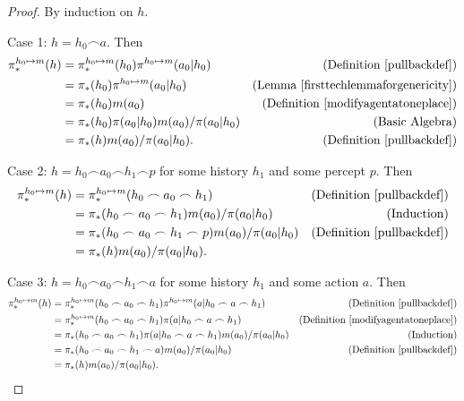 \documentclass[runningheads]{llncs}
\begin{document}
\begin{proof}
    By induction on $h$.

    Case 1: $h=h_0\frown a$. Then
    \begin{align*}
        \pi^{h_0\mapsto m}_*(h)
        &= \pi^{h_0\mapsto m}_*(h_0)\pi^{h_0\mapsto m}(a_0|h_0)
            &\mbox{(Definition \ref{pullbackdef})}\\
        &= \pi_*(h_0)\pi^{h_0\mapsto m}(a_0|h_0)
            &\mbox{(Lemma \ref{firsttechlemmaforgenericity})}\\
        &= \pi_*(h_0)m(a_0)
            &\mbox{(Definition \ref{modifyagentatoneplace})}\\
        &= \pi_*(h_0)\pi(a_0|h_0)m(a_0)/\pi(a_0|h_0)
            &\mbox{(Basic Algebra)}\\
        &= \pi_*(h)m(a_0)/\pi(a_0|h_0).
            &\mbox{(Definition \ref{pullbackdef})}
    \end{align*}

    Case 2: $h=h_0\frown a_0\frown h_1\frown p$ for some history $h_1$
        and some percept $p$. Then
    \begin{align*}
        \pi^{h_0\mapsto m}_*(h)
        &= \pi^{h_0\mapsto m}_*(h_0\frown a_0\frown h_1)
            &\mbox{(Definition \ref{pullbackdef})}\\
        &= \pi_*(h_0\frown a_0\frown h_1)m(a_0)/\pi(a_0|h_0)
            &\mbox{(Induction)}\\
        &= \pi_*(h_0\frown a_0\frown h_1\frown p)m(a_0)/\pi(a_0|h_0)
            &\mbox{(Definition \ref{pullbackdef})}\\
        &= \pi_*(h)m(a_0)/\pi(a_0|h_0).
    \end{align*}

    Case 3: $h=h_0\frown a_0\frown h_1\frown a$ for some history $h_1$
        and some action $a$. Then
    \begin{align*}
        \pi^{h_0\mapsto m}_*(h)
        &= \pi^{h_0\mapsto m}_*(h_0\frown a_0\frown h_1)
            \pi^{h_0\mapsto m}(a|h_0\frown a\frown h_1)
            &\mbox{(Definition \ref{pullbackdef})}\\
        &= \pi^{h_0\mapsto m}_*(h_0\frown a_0\frown h_1)
            \pi(a|h_0\frown a\frown h_1)
            &\mbox{(Definition \ref{modifyagentatoneplace})}\\
        &= \pi_*(h_0\frown a_0\frown h_1)\pi(a|h_0\frown a\frown h_1)m(a_0)/\pi(a_0|h_0)
            &\mbox{(Induction)}\\
        &= \pi_*(h_0\frown a_0\frown h_1\frown a)m(a_0)/\pi(a_0|h_0)
            &\mbox{(Definition \ref{pullbackdef})}\\
        &= \pi_*(h)m(a_0)/\pi(a_0|h_0).
    \end{align*}
\end{proof}
\end{document}
